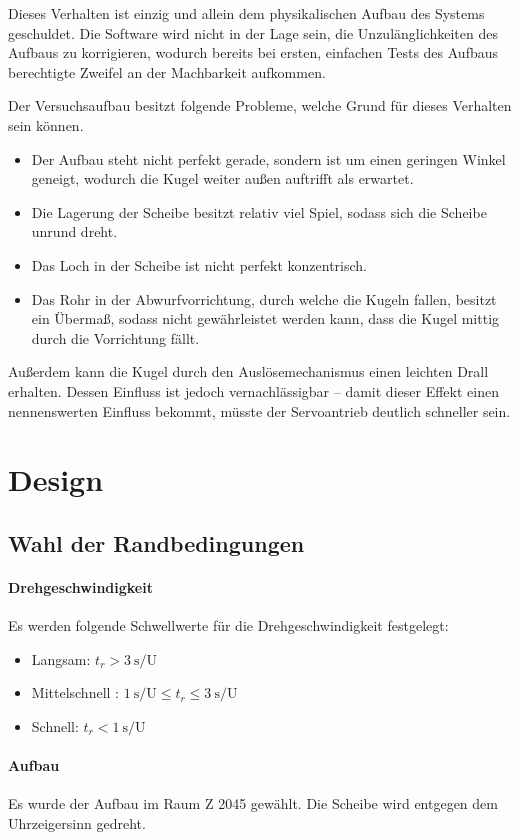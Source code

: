 \documentclass{kis}
\begin{document}
Dieses Verhalten ist einzig und allein dem physikalischen Aufbau des Systems geschuldet. Die Software wird nicht in der Lage sein, die Unzulänglichkeiten des Aufbaus zu korrigieren, wodurch bereits bei ersten, einfachen Tests des Aufbaus berechtigte Zweifel an der Machbarkeit aufkommen.

Der Versuchsaufbau besitzt folgende Probleme, welche Grund für dieses Verhalten sein können.
\begin{itemize}
	\item Der Aufbau steht nicht perfekt gerade, sondern ist um einen geringen Winkel geneigt, wodurch die Kugel weiter außen auftrifft als erwartet.
	\item Die Lagerung der Scheibe besitzt relativ viel Spiel, sodass sich die Scheibe unrund dreht.
	\item Das Loch in der Scheibe ist nicht perfekt konzentrisch.
	\item Das Rohr in der Abwurfvorrichtung, durch welche die Kugeln fallen, besitzt ein Übermaß, sodass nicht gewährleistet werden kann, dass die Kugel mittig durch die Vorrichtung fällt.
\end{itemize}
Außerdem kann die Kugel durch den Auslösemechanismus einen leichten Drall erhalten. Dessen Einfluss ist jedoch vernachlässigbar -- damit dieser Effekt einen nennenswerten Einfluss bekommt, müsste der Servoantrieb deutlich schneller sein.

\section{Design}
\subsection{Wahl der Randbedingungen}
\paragraph{Drehgeschwindigkeit}
Es werden folgende Schwellwerte für die Drehgeschwindigkeit festgelegt:
\begin{itemize}
	\item Langsam: $t_r>3~\text{s/U}$
	\item Mittelschnell : $1~\text{s/U}\leq t_r\leq 3~\text{s/U}$
	\item Schnell: $t_r<1~\text{s/U}$
\end{itemize}

\paragraph{Aufbau}
Es wurde der Aufbau im Raum Z 2045 gewählt. Die Scheibe wird entgegen dem Uhrzeigersinn gedreht.
\end{document}
